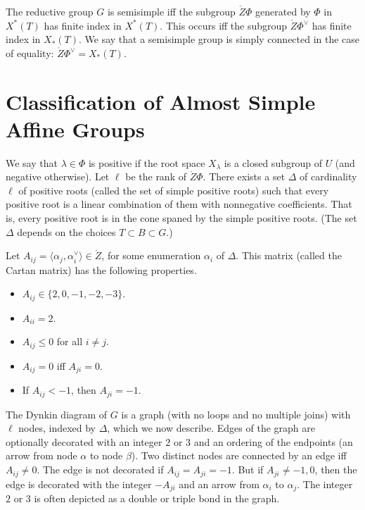 
The reductive group $G$ is semisimple iff the subgroup $\ring{Z}\Phi$
generated by $\Phi$ in $X^*(T)$ has finite index in $X^*(T)$.  This
occurs iff the subgroup $\ring{Z}\Phi^\vee$ has finite index in $X_*(T)$.
We say that a semisimple group is simply connected in the case of
equality: $\ring{Z}\Phi^\vee = X_*(T)$.

\section{Classification of Almost Simple Affine Groups}

We say that $\lambda\in\Phi$ is positive if the root space $X_\lambda$
is a closed subgroup of $U$ (and negative otherwise).  Let $\ell$ be
the rank of $\ring{Z}\Phi$.  There exists a set $\Delta$ of
cardinality $\ell$ of positive roots (called the set of simple
positive roots) such that every positive root is a linear combination
of them with nonnegative coefficients.  That is, every positive root is
in the cone spaned by the simple positive roots.
(The set $\Delta$ depends on the choices $T\subset B\subset G$.)

Let $A_{ij} = \langle \alpha_j,\alpha_i^\vee\rangle\in\ring{Z}$, for
some enumeration $\alpha_i$ of $\Delta$.
This matrix (called the Cartan matrix) has the following properties.
\begin{itemize}
\item $A_{ij}\in \{2,0,-1,-2,-3\}$.
\item $A_{ii}=2$.
\item $A_{ij}\le 0$ for all $i\ne j$.
\item $A_{ij}=0$ iff $A_{ji}=0$.
\item If $A_{ij}<-1$, then $A_{ji}=-1$.
  \end{itemize}

The Dynkin diagram of $G$ is a graph (with no loops and no multiple
joins) with $\ell$ nodes, indexed by $\Delta$, which we now describe.
Edges of the graph are optionally decorated with an integer $2$ or $3$
and an ordering of the endpoints (an arrow from node $\alpha$ to node
$\beta$).  Two distinct nodes are connected by an edge iff $A_{ij}\ne
0$.  The edge is not decorated if $A_{ij}=A_{ji}=-1$.  But if
$A_{ji}\ne -1,0$, then the edge is decorated with the integer
$-A_{ji}$ and an arrow from $\alpha_i$ to $\alpha_j$.  The integer $2$
or $3$ is often depicted as a double or triple bond in the graph.

